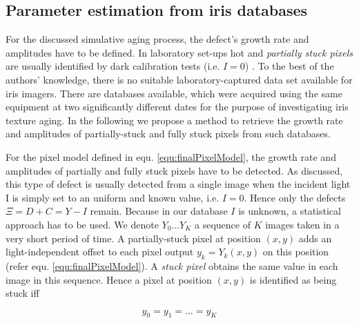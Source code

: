 \documentclass[10pt,twocolumn,letterpaper]{article}
\begin{document}
 
 
 
 \subsection{Parameter estimation from iris databases}
 \label{hotPixelRate}
 For the discussed simulative aging process, the defect's growth rate and amplitudes have to be defined. In laboratory set-ups hot and \emph{partially stuck pixels} are usually identified by dark calibration tests (i.e. $I=0$) \cite{defectIdentification}. To the best of the authors' knowledge, there is no suitable laboratory-captured data set available for iris imagers. There are databases \cite{czajkaTemplateAging} available, which were acquired using the same equipment at two significantly different dates for the purpose of investigating iris texture aging. In the following we propose a method to retrieve the growth rate and amplitudes of partially-stuck and fully stuck pixels from such databases.

For the pixel model defined in equ. \ref{equ:finalPixelModel}, the growth rate and amplitudes of partially and fully stuck pixels have to be detected. As discussed, this type of defect is usually detected from a single image when the incident light I is simply set to an uniform and known value, i.e. $I=0$. Hence only the defects $\Xi = D+C = Y-I$ remain. Because in our database $I$ is unknown, a statistical approach has to be used.
We denote $Y_0 \dots Y_K$ a sequence of $K$ images taken in a very short period of time. A partially-stuck pixel at position $(x,y)$ adds an light-independent offset to each pixel output $y_k = Y_k({x,y})$ on this position (refer equ. \ref{equ:finalPixelModel}). A \emph{stuck pixel} obtains the same value in each image in this sequence. Hence a pixel at position $(x,y)$ is identified as being stuck iff

\begin{equation}
y_{0} = y_{1} = \dots = y_{K} \label{equ:conditionStuck}
\end{equation}
\end{document}
